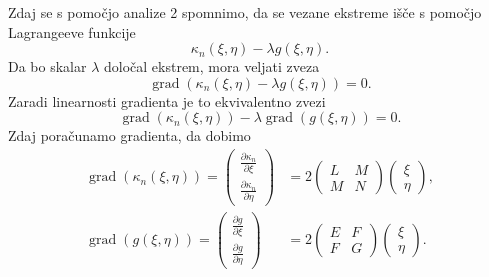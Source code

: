     Zdaj se s pomočjo analize 2 spomnimo, da se vezane ekstreme išče s pomočjo Lagrangeeve funkcije \begin{equation*}
      \kappa_n(\xi, \eta) - \lambda g(\xi, \eta).
    \end{equation*}  
    Da bo skalar $\lambda$ določal ekstrem, mora veljati zveza \begin{equation*}
      \operatorname{grad}(\kappa_n(\xi, \eta) - \lambda g(\xi, \eta)) = 0.
    \end{equation*}  
    Zaradi linearnosti gradienta je to ekvivalentno zvezi \begin{equation*}
        \operatorname{grad}(\kappa_n(\xi, \eta)) - \lambda \operatorname{grad}(g(\xi, \eta)) = 0.
    \end{equation*}
    Zdaj poračunamo gradienta, da dobimo \begin{align*}
        \operatorname{grad}(\kappa_n(\xi, \eta)) = \begin{pmatrix}
            \frac{ \partial \kappa_n }{ \partial \xi } \\
            \frac{ \partial \kappa_n }{ \partial \eta }
        \end{pmatrix}  &= 2 \begin{pmatrix}
        L & M \\
        M & N
        \end{pmatrix}  \begin{pmatrix}
            \xi \\
            \eta
        \end{pmatrix},  \\
        \operatorname{grad}(g(\xi, \eta)) = \begin{pmatrix}
            \frac{ \partial g }{ \partial \xi } \\
            \frac{ \partial g }{ \partial \eta }
        \end{pmatrix}  &= 2 \begin{pmatrix}
        E & F \\
        F & G
        \end{pmatrix}  \begin{pmatrix}
            \xi \\
            \eta
        \end{pmatrix}.
    \end{align*}

